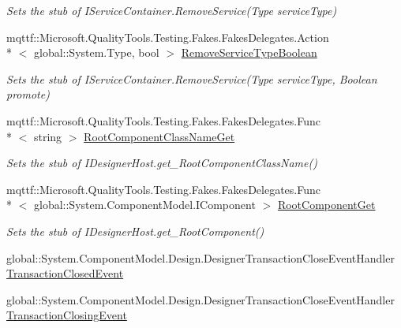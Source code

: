 \begin{DoxyCompactItemize}
\begin{DoxyCompactList}\small\item\em Sets the stub of I\-Service\-Container.\-Remove\-Service(\-Type service\-Type)\end{DoxyCompactList}\item 
mqttf\-::\-Microsoft.\-Quality\-Tools.\-Testing.\-Fakes.\-Fakes\-Delegates.\-Action\\*
$<$ global\-::\-System.\-Type, bool $>$ \hyperlink{class_system_1_1_component_model_1_1_design_1_1_serialization_1_1_fakes_1_1_stub_i_designer_loader_host2_a938836842fda5dbfd40bf68cc357fbb3}{Remove\-Service\-Type\-Boolean}
\begin{DoxyCompactList}\small\item\em Sets the stub of I\-Service\-Container.\-Remove\-Service(\-Type service\-Type, Boolean promote)\end{DoxyCompactList}\item 
mqttf\-::\-Microsoft.\-Quality\-Tools.\-Testing.\-Fakes.\-Fakes\-Delegates.\-Func\\*
$<$ string $>$ \hyperlink{class_system_1_1_component_model_1_1_design_1_1_serialization_1_1_fakes_1_1_stub_i_designer_loader_host2_a3bf22cd3b6538aaf18c90bb0ab99c76f}{Root\-Component\-Class\-Name\-Get}
\begin{DoxyCompactList}\small\item\em Sets the stub of I\-Designer\-Host.\-get\-\_\-\-Root\-Component\-Class\-Name()\end{DoxyCompactList}\item 
mqttf\-::\-Microsoft.\-Quality\-Tools.\-Testing.\-Fakes.\-Fakes\-Delegates.\-Func\\*
$<$ global\-::\-System.\-Component\-Model.\-I\-Component $>$ \hyperlink{class_system_1_1_component_model_1_1_design_1_1_serialization_1_1_fakes_1_1_stub_i_designer_loader_host2_a3a6f557cd285c62a5bd7406eda4d52dd}{Root\-Component\-Get}
\begin{DoxyCompactList}\small\item\em Sets the stub of I\-Designer\-Host.\-get\-\_\-\-Root\-Component()\end{DoxyCompactList}\item 
global\-::\-System.\-Component\-Model.\-Design.\-Designer\-Transaction\-Close\-Event\-Handler \hyperlink{class_system_1_1_component_model_1_1_design_1_1_serialization_1_1_fakes_1_1_stub_i_designer_loader_host2_a5c40ebd754b65db06e6c71adba39a42a}{Transaction\-Closed\-Event}
\item 
global\-::\-System.\-Component\-Model.\-Design.\-Designer\-Transaction\-Close\-Event\-Handler \hyperlink{class_system_1_1_component_model_1_1_design_1_1_serialization_1_1_fakes_1_1_stub_i_designer_loader_host2_a11a79bfd0180bf37f6c6425bdb697adc}{Transaction\-Closing\-Event}

\end{DoxyCompactItemize}
